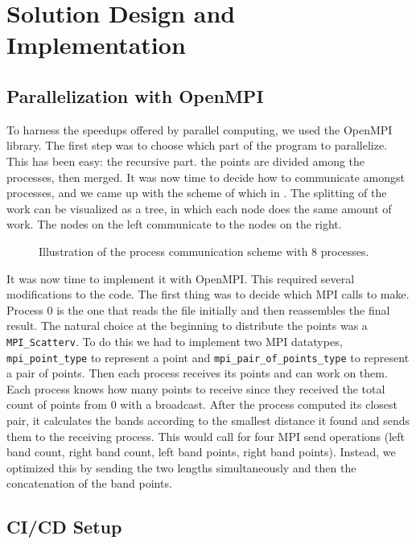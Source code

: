 \section{Solution Design and Implementation}
\label{sec:parallelization}

\subsection{Parallelization with OpenMPI}
To harness the speedups offered by parallel computing, we used the OpenMPI library.
The first step was to choose which part of the program to parallelize.
This has been easy: the recursive part.
the points are divided among the processes, then merged.
It was now time to decide how to communicate amongst processes, and we came up with the scheme of which in .
The splitting of the work can be visualized as a tree, in which each node does the same amount of work. The nodes on the left communicate to the nodes on the right.

\begin{figure}[!ht]
    \centering
    
    \caption{Illustration of the process communication scheme with 8 processes.}
    \label{fig:albero_bell_albero}
\end{figure}

It was now time to implement it with OpenMPI. This required several modifications to the code. The first thing was to decide which MPI calls to make.
Process 0 is the one that reads the file initially and then reassembles the final result.
The natural choice at the beginning to distribute the points was a \verb+MPI_Scatterv+. To do this we had to implement two MPI datatypes, \verb+mpi_point_type+ to represent a point and \verb+mpi_pair_of_points_type+
to represent a pair of points.
Then each process receives its points and can work on them. Each process knows how many points to receive since they received the total count of points from 0 with a broadcast.
After the process computed its closest pair, it calculates the bands according to the smallest distance it found and sends them to the receiving process.
This would call for four MPI send operations (left band count, right band count, left band points, right band points). Instead, we optimized this by sending the two lengths simultaneously and then the concatenation of the band points.

\subsection{CI/CD Setup}

